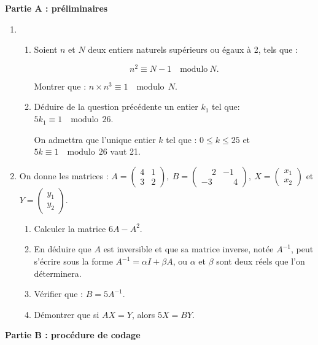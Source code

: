 \documentclass[10pt]{article}
\begin{document}
\textbf{Partie A : préliminaires}

\medskip
 
\begin{enumerate}
\item 
	\begin{enumerate}
		\item Soient $n$ et $N$ deux entiers naturels supérieurs ou égaux à 2, tels  que :
		
\[n^2 \equiv  N -1\quad  \text{modulo}\: N.\]
 
Montrer que : $n \times  n^3 \equiv 1 \quad  \text{modulo}\:\: N$. 
		\item Déduire de la question précédente un entier $k_{1}$ tel que: $5k_{1} \equiv 1\quad  \text{modulo}\:\: 26$. 

On admettra que l'unique entier $k$ tel que : $ 0 \leqslant k \leqslant   25$ et $5k \equiv 1 \quad  \text{modulo}\:\: 26$ vaut 21.  
	\end{enumerate}
\item On donne les matrices : $A = \begin{pmatrix}4&1\\3&2\end{pmatrix},\: B = \begin{pmatrix}\phantom{-}2&- 1\\- 3&\phantom{-}4\end{pmatrix},\: X = \begin{pmatrix}x_{1}\\x_{2}\end{pmatrix}$ et $Y = \begin{pmatrix}y_{1}\\y_{2}\end{pmatrix}$.
	\begin{enumerate}
		\item Calculer la matrice $6A - A^2$. 
		\item En déduire que $A$ est inversible et que sa matrice inverse, notée $A^{- 1}$, peut s'écrire sous la  forme $A^{-1} = \alpha I + \beta A$, ou $\alpha$ et $\beta$ sont deux réels que l'on  déterminera. 
		\item Vérifier que : $B = 5A^{-1}$. 
		\item Démontrer que si $A X = Y$, alors $5X = B Y$.
	\end{enumerate}
\end{enumerate}	

\bigskip
	 
\textbf{Partie B : procédure de codage}
\end{document}
